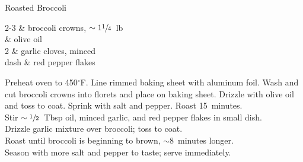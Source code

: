\setHeadlines
{
}

\begin{recipe}
[ %
    source = Inspired by Rayn,
]
{Roasted Broccoli}

    \ingredients
    {
		2-3 & broccoli crowns, $\sim1\sfrac{1}{4}$~lb \\
		 & olive oil \\
		2 & garlic cloves, minced \\
		dash & red pepper flakes \\
    }
    
    \preparation
    {
        \step Preheat oven to 450$^{\circ}$F. Line rimmed baking sheet with aluminum foil. 
		\step Wash and cut broccoli crowns into florets and place on baking sheet. 
		\step Drizzle with olive oil and toss to coat. Sprink with salt and pepper. 
		\step Roast 15~minutes. \\
		\step Stir $\sim\sfrac{1}{2}$~Tbsp oil, minced garlic, and red pepper flakes in small dish. \\
		\step Drizzle garlic mixture over broccoli; toss to coat. \\
		\step Roast until broccoli is beginning to brown, $\sim$8~minutes longer. \\
		\step Season with more salt and pepper to taste; serve immediately. \\
    }

\end{recipe}
